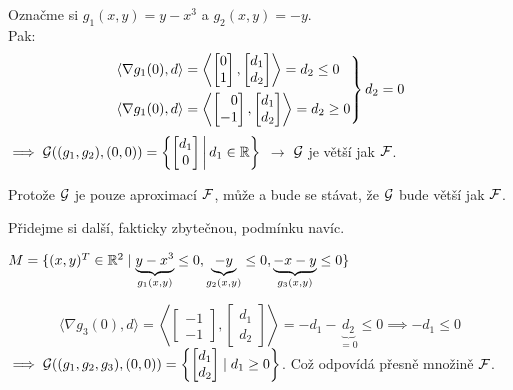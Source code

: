 Označme si $g_1(x, y) = y-x^3$ a $g_2(x, y) = -y$.\\
Pak: 
\[
    \begin{rcases*}
        \langle \nabla g_1(0), d \rangle = \left\langle 
        \begin{bmatrix}
            0 \\
            1
        \end{bmatrix},
        \begin{bmatrix}
            d_1 \\
            d_2
        \end{bmatrix}\right\rangle = d_2 \leq 0\\
        \langle \nabla g_1(0), d \rangle = \left\langle 
        \begin{bmatrix}
            \phantom{-}0 \\
            -1
        \end{bmatrix},
        \begin{bmatrix}
            d_1 \\
            d_2
        \end{bmatrix}\right\rangle = d_2 \geq 0
    \end{rcases*} d_2 = 0
\]
$\implies \mathcal{G}((g_1, g_2), (0, 0)) = \left\lbrace 
\begin{bmatrix}
    d_1 \\
    0    
\end{bmatrix} \, \middle| \, d_1 \in \mathbb{R} \right\rbrace$ $\rightarrow$ $\mathcal{G}$ je větší jak $\mathcal{F}$. 

Protože $\mathcal{G}$ je pouze aproximací $\mathcal{F}$, může a bude se stávat, že $\mathcal{G}$ bude větší jak $\mathcal{F}$.

Přidejme si další, fakticky zbytečnou, podmínku navíc.

$M = \{(x, y)^T \in \mathbb{R}^2 \mid \underbrace{y - x^3}_{g_1(x, y)} \leq 0, \underbrace{-y}_{g_2(x,y)} \leq 0, 
\underbrace{-x -y}_{g_3(x,y)} \leq 0\}$

\[
    \langle \nabla g_3(0), d\rangle = \left\langle 
    \begin{bmatrix}
        -1 \\
        -1
    \end{bmatrix},
    \begin{bmatrix}
        d_1 \\
        d_2
    \end{bmatrix}
    \right\rangle = -d_1 - \underbrace{d_2}_{=0} \leq 0 \implies -d_1 \leq 0
\]
$\implies \mathcal{G}((g_1, g_2, g_3), (0,0)) = \left\lbrace 
\begin{bmatrix}
    d_1 \\
    d_2    
\end{bmatrix} \mid d_1 \geq 0 \right\rbrace$. Což odpovídá přesně množině $\mathcal{F}$.

